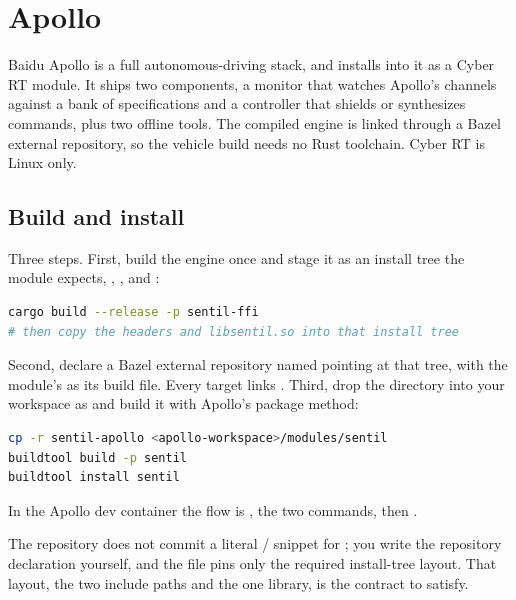 \chapter{Apollo}
\label{ch:apollo}

Baidu Apollo is a full autonomous-driving stack, and \sentil{} installs into it as a Cyber RT module. It ships two components, a monitor that watches Apollo's channels against a bank of specifications and a controller that shields or synthesizes commands, plus two offline tools. The compiled engine is linked through a Bazel external repository, so the vehicle build needs no Rust toolchain. Cyber RT is Linux only.

\section{Build and install}

Three steps. First, build the engine once and stage it as an install tree the module expects, , , and :

\begin{lstlisting}[language=bash]
cargo build --release -p sentil-ffi
# then copy the headers and libsentil.so into that install tree
\end{lstlisting}

Second, declare a Bazel external repository named  pointing at that tree, with the module's  as its build file. Every target links . Third, drop the directory into your workspace as  and build it with Apollo's package method:

\begin{lstlisting}[language=bash]
cp -r sentil-apollo <apollo-workspace>/modules/sentil
buildtool build -p sentil
buildtool install sentil
\end{lstlisting}

In the Apollo dev container the flow is , the two  commands, then .

\begin{pitfall}
The repository does not commit a literal / snippet for ; you write the repository declaration yourself, and the  file pins only the required install-tree layout. That layout, the two include paths and the one library, is the contract to satisfy.
\end{pitfall}

